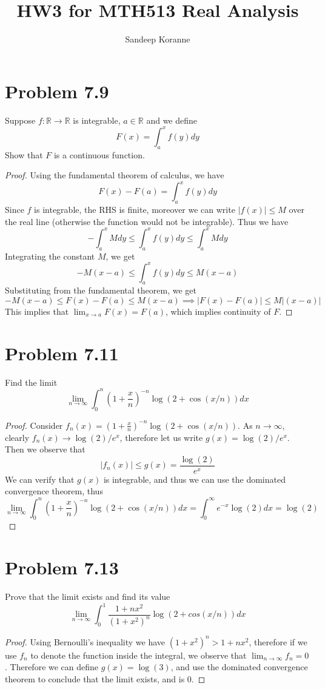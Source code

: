 \documentclass{article}
\def\RR{\mathbb R}
\begin{document}
\title{HW3 for MTH513 Real Analysis}
\author{ Sandeep Koranne}
\maketitle

\section*{Problem 7.9} Suppose $f:\RR\to\RR$ is integrable, $a\in \RR$ and
we define
\[
F(x) = \int_a^x f(y) dy
\]
Show that $F$ is a continuous function.
\begin{proof}
Using the fundamental theorem of calculus, we have
\[
F(x)-F(a) = \int_a^x f(y) dy
\]
Since $f$ is integrable, the RHS is finite, moreover we can write $|f(x)|\le M$
over the real line (otherwise the function would not be integrable). Thus we have
\[
-\int_a^x M dy \le \int_a^x f(y) dy \le \int_a^x M dy
\]
Integrating the constant $M$, we get
\[
-M(x-a) \le \int_a^x f(y) dy \le M(x-a)
\]
Substituting from the fundamental theorem, we get
\[
-M(x-a) \le F(x)-F(a) \le M(x-a) \implies |F(x)-F(a)|\le M|(x-a)|
\]
This implies that $\lim_{x\to a} F(x)=F(a)$, which implies continuity of $F$.
\end{proof}

\section*{Problem 7.11}Find the limit
\[
\lim_{n\to\infty} \int_0^n \left( 1 + \frac{x}{n}\right)^{-n} \log(2+\cos(x/n)) dx
\]
\begin{proof}
Consider $f_n(x) = \left( 1 + \frac{x}{n}\right)^{-n} \log(2+\cos(x/n))$.
As $n\to\infty$, clearly $f_n(x)\to \log(2)/e^x$, therefore let us write
$g(x)=\log(2)/e^x$. 
Then we observe that
\[
|f_n(x)| \le g(x)=\frac{\log(2)}{e^x}
\]
We can verify that $g(x)$ is integrable, and thus we
can use the dominated convergence theorem, thus
\[
\lim_{n\to\infty} \int_0^n \left( 1 + \frac{x}{n}\right)^{-n} \log(2+\cos(x/n)) dx
 = \int_0^\infty e^{-x}\log(2) dx = \log(2)
\]
\end{proof}

\section*{Problem 7.13}Prove that the limit exists and find its value
\[
\lim_{n\to\infty} \int_0^1 \frac{1+nx^2}{(1+x^2)^n} \log(2+cos(x/n)) dx 
\]
\begin{proof}
Using Bernoulli's inequality we have $(1+x^2)^n > 1+nx^2$, therefore if
we use $f_n$ to denote the function inside the integral, we observe that
$\lim_{n\to\infty} f_n=0$. Therefore we can define $g(x)=\log(3)$, and 
use the dominated convergence theorem to conclude that the limit exists, and
is 0.
\end{proof}
\end{document}
